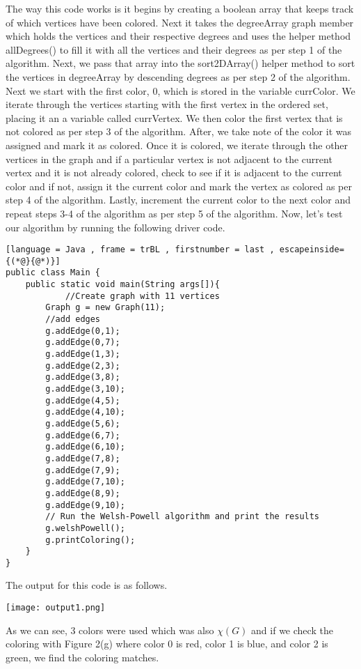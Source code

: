 \documentclass[12pt, letterpaper]{article}
\begin{document}
The way this code works is it begins by creating a boolean array that keeps track of which vertices have been colored. Next it takes the degreeArray graph member which holds the vertices and their respective degrees and uses the helper method allDegrees() to fill it with all the vertices and their degrees as per step 1 of the algorithm. Next, we pass that array into the sort2DArray() helper method to sort the vertices in degreeArray by descending degrees as per step 2 of the algorithm. Next we start with the first color, 0, which is stored in the variable currColor. We iterate through the vertices starting with the first vertex in the ordered set, placing it an a variable called currVertex. We then color the first vertex that is not colored as per step 3 of the algorithm. After, we take note of the color it was assigned and mark it as colored. Once it is colored, we iterate through the other vertices in the graph and if a particular vertex is not adjacent to the current vertex and it is not already colored, check to see if it is adjacent to the current color and if not, assign it the current color and mark the vertex as colored as per step 4 of the algorithm. Lastly, increment the current color to the next color and repeat steps 3-4 of the algorithm as per step 5 of the algorithm. Now, let's test our algorithm by running the following driver code.


\begin{lstlisting}[language = Java , frame = trBL , firstnumber = last , escapeinside={(*@}{@*)}]
public class Main {
    public static void main(String args[]){
    		//Create graph with 11 vertices
        Graph g = new Graph(11);
        //add edges
        g.addEdge(0,1);
        g.addEdge(0,7);
        g.addEdge(1,3);
        g.addEdge(2,3);
        g.addEdge(3,8);
        g.addEdge(3,10);
        g.addEdge(4,5);
        g.addEdge(4,10);
        g.addEdge(5,6);
        g.addEdge(6,7);
        g.addEdge(6,10);
        g.addEdge(7,8);
        g.addEdge(7,9);
        g.addEdge(7,10);
        g.addEdge(8,9);
        g.addEdge(9,10);
        // Run the Welsh-Powell algorithm and print the results
        g.welshPowell();
        g.printColoring();
    }
}
\end{lstlisting}


The output for this code is as follows.
\begin{center}
\texttt{[image: output1.png]}
\end{center}


As we can see, 3 colors were used which was also $\chi(G)$ and if we check the coloring with Figure 2(g) where color 0 is red, color 1 is blue, and color 2 is green, we find the coloring matches.
\end{document}
